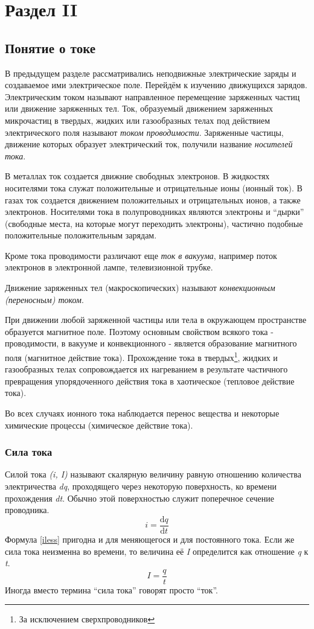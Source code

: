 \documentclass[a4paper,10pt]{book}
\begin{document}
\part{Раздел II}
\chapter{Понятие о токе}
В предыдущем разделе рассматривались неподвижные электрические заряды и создаваемое ими электрическое поле. Перейдём к изучению движущихся зарядов. Электрическим током называют направленное перемещение заряженных частиц или движение заряженных тел. Ток, образуемый движением заряженных микрочастиц в твердых, жидких или газообразных телах под действием электрического поля называют \emph{током проводимости}. Заряженные частицы, движение которых образует электрический ток, получили название \emph{носителей тока}.

В металлах ток создается движние свободных электронов. В жидкостях носителями тока служат положительные и отрицательные ионы (ионный ток). В газах ток создается движением положительных и отрицательных ионов, а также электронов. Носителями тока в полупроводниках являются электроны и ``дырки'' (свободные места, на которые могут переходить электроны), частично подобные положительные положительным зарядам.

Кроме тока проводимости различают еще \emph{ток в вакуума}, например поток электронов в электронной лампе, телевизионной 
трубке. 

Движение заряженных тел (макроскопических) называют \emph{конвекционным (переносным) током}.

При движении любой заряженной частицы или тела в окружающем пространстве образуется магнитное поле. Поэтому основным свойством 
всякого тока - проводимости, в вакууме и конвекционного - является образование магнитного поля (магнитное действие тока). Прохождение тока в твердых\footnote{За исключением сверхпроводников}, жидких и газообразных телах сопровождается их нагреванием в результате частичного превращения упорядоченного действия тока в хаотическое (тепловое действие тока).

Во всех случаях ионного тока наблюдается перенос вещества и некоторые химические процессы (химическое действие тока).

\section{Сила тока}
Силой тока \emph{(i, I)} называют скалярную величину равную отношению количества электричества \emph{dq}, проходящего через некоторую
поверхность, ко времени прохождения \emph{dt}. Обычно этой поверхностью служит поперечное сечение проводника.
\begin{equation}\label{iless}
 i = \frac{\mathrm{d}q}{\mathrm{d}t}
\end{equation}
Формула \ref{iless} пригодна и для меняющегося и для постоянного тока. Если же сила тока неизменна во времени, то величина её \emph{I} определится как отношение \emph{q} к \emph{t}.
\begin{equation}\label{igreat}
 I = \frac{q}{t}
\end{equation}
Иногда вместо термина ``сила тока'' говорят просто ``ток''.
\end{document}
